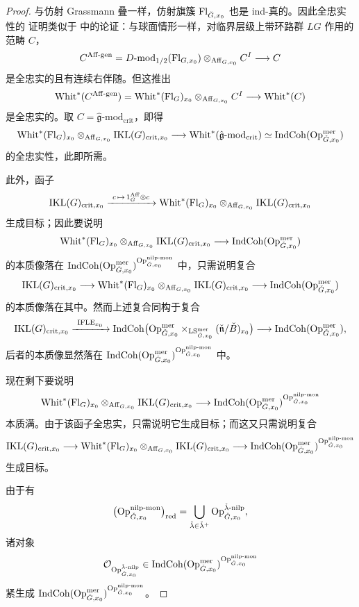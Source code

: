 \begin{proof}
与仿射 Grassmann 叠一样，仿射旗簇 $\mathrm{Fl}_{\check G,x_0}$ 也是 ind-真的。因此全忠实性的
证明类似于 \cite[第 7.3 节]{ABC+24a} 中的论证：与球面情形一样，对临界层级上带环路群
$LG$ 作用的范畴 $C$，
\[
C^{\mathrm{Aff\text{-}gen}}
=D\text{-}\mathrm{mod}_{1/2}(\mathrm{Fl}_{G,x_0})
\otimes_{\mathrm{Aff}_{G,x_0}}C^{I}\longrightarrow C
\]
是全忠实的且有连续右伴随。但这推出
\[
\mathrm{Whit}^{*}(C^{\mathrm{Aff\text{-}gen}})
=\mathrm{Whit}^{*}(\mathrm{Fl}_G)_{x_0}\otimes_{\mathrm{Aff}_{G,x_0}}C^{I}
\longrightarrow \mathrm{Whit}^{*}(C)
\]
是全忠实的。取 $C=\hat{\mathfrak{g}}\text{-}\mathrm{mod}_{\mathrm{crit}}$，即得
\[
\mathrm{Whit}^{*}(\mathrm{Fl}_G)_{x_0}\otimes_{\mathrm{Aff}_{G,x_0}}\mathrm{IKL}(G)_{\mathrm{crit},x_0}
\longrightarrow
\mathrm{Whit}^{*}(\hat{\mathfrak{g}}\text{-}\mathrm{mod}_{\mathrm{crit}})
\simeq \mathrm{IndCoh}(\mathrm{Op}^{\mathrm{mer}}_{\check G,x_0})
\]
的全忠实性，此即所需。

此外，函子
\[
\mathrm{IKL}(G)_{\mathrm{crit},x_0}\xrightarrow{\ c\,\mapsto\, 1^{\mathrm{Aff}}_G\otimes c\ }
\mathrm{Whit}^{*}(\mathrm{Fl}_G)_{x_0}\otimes_{\mathrm{Aff}_{G,x_0}}\mathrm{IKL}(G)_{\mathrm{crit},x_0}
\]
生成目标；因此要说明
\[
\mathrm{Whit}^{*}(\mathrm{Fl}_G)_{x_0}\otimes_{\mathrm{Aff}_{G,x_0}}\mathrm{IKL}(G)_{\mathrm{crit},x_0}
\longrightarrow \mathrm{IndCoh}(\mathrm{Op}^{\mathrm{mer}}_{\check G,x_0})
\]
的本质像落在
$\mathrm{IndCoh}(\mathrm{Op}^{\mathrm{mer}}_{\check G,x_0})^{\mathrm{Op}^{\mathrm{nilp\text{-}mon}}_{\check G,x_0}}$
中，只需说明复合
\[
\mathrm{IKL}(G)_{\mathrm{crit},x_0}\longrightarrow
\mathrm{Whit}^{*}(\mathrm{Fl}_G)_{x_0}\otimes_{\mathrm{Aff}_{G,x_0}}\mathrm{IKL}(G)_{\mathrm{crit},x_0}
\longrightarrow \mathrm{IndCoh}(\mathrm{Op}^{\mathrm{mer}}_{\check G,x_0})
\]
的本质像落在其中。然而上述复合同构于复合
\[
\mathrm{IKL}(G)_{\mathrm{crit},x_0}\xrightarrow{\ \mathrm{IFLE}_{x_0}\ }
\mathrm{IndCoh}\bigl(\mathrm{Op}^{\mathrm{mer}}_{\check G,x_0}
\times_{\mathrm{LS}^{\mathrm{mer}}_{\check G,x_0}}(\check{\mathfrak{n}}/\check B)_{x_0}\bigr)
\longrightarrow \mathrm{IndCoh}(\mathrm{Op}^{\mathrm{mer}}_{\check G,x_0}),
\]
后者的本质像显然落在
$\mathrm{IndCoh}(\mathrm{Op}^{\mathrm{mer}}_{\check G,x_0})^{\mathrm{Op}^{\mathrm{nilp\text{-}mon}}_{\check G,x_0}}$ 中。

现在剩下要说明
\[
\mathrm{Whit}^{*}(\mathrm{Fl}_G)_{x_0}\otimes_{\mathrm{Aff}_{G,x_0}}\mathrm{IKL}(G)_{\mathrm{crit},x_0}
\longrightarrow
\mathrm{IndCoh}(\mathrm{Op}^{\mathrm{mer}}_{\check G,x_0})^{\mathrm{Op}^{\mathrm{nilp\text{-}mon}}_{\check G,x_0}}
\]
本质满。由于该函子全忠实，只需说明它生成目标；而这又只需说明复合
\[
\mathrm{IKL}(G)_{\mathrm{crit},x_0}\longrightarrow
\mathrm{Whit}^{*}(\mathrm{Fl}_G)_{x_0}\otimes_{\mathrm{Aff}_{G,x_0}}\mathrm{IKL}(G)_{\mathrm{crit},x_0}
\longrightarrow
\mathrm{IndCoh}(\mathrm{Op}^{\mathrm{mer}}_{\check G,x_0})^{\mathrm{Op}^{\mathrm{nilp\text{-}mon}}_{\check G,x_0}}
\]
生成目标。

由于有
\[
\bigl(\mathrm{Op}^{\mathrm{nilp\text{-}mon}}_{\check G,x_0}\bigr)_{\mathrm{red}}
=\bigcup_{\check\lambda\in \check\lambda^{+}}
\mathrm{Op}^{\check\lambda\text{-}\mathrm{nilp}}_{\check G,x_0},
\]
诸对象
\[
\mathcal{O}_{\mathrm{Op}^{\check\lambda\text{-}\mathrm{nilp}}_{\check G,x_0}}
\in
\mathrm{IndCoh}(\mathrm{Op}^{\mathrm{mer}}_{\check G,x_0})^{\mathrm{Op}^{\mathrm{nilp\text{-}mon}}_{\check G,x_0}}
\]
紧生成
$\mathrm{IndCoh}(\mathrm{Op}^{\mathrm{mer}}_{\check G,x_0})^{\mathrm{Op}^{\mathrm{nilp\text{-}mon}}_{\check G,x_0}}$。


\end{proof}
